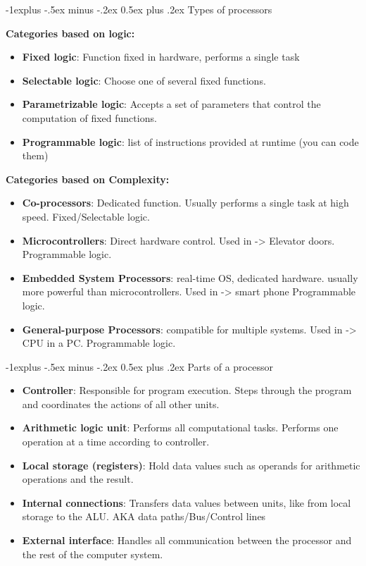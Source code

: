 \documentclass[letterpaper, 8pt]{extarticle}
\makeatletter
\renewcommand{\subsection}{\@startsection{subsection}{2}{0mm}%
                                {-1explus -.5ex minus -.2ex}%
                                {0.5ex plus .2ex}%
                                {\normalfont\small\bfseries}}
\makeatother
\begin{document}
\begin{multicols*}{4}
	\subsection{Types of processors}

	\textbf{Categories based on logic:} \\
	\begin{itemize}
		\item \textbf{Fixed logic}: Function fixed in hardware, performs a single task
		\item \textbf{Selectable logic}: Choose one of several fixed functions.
		\item \textbf{Parametrizable logic}: Accepts a set of parameters that control the computation of fixed functions.
		\item \textbf{Programmable logic}: list of instructions provided at runtime (you can code them)
	\end{itemize}

	\textbf{Categories based on Complexity:} \\
	\begin{itemize}
		\item \textbf{Co-processors}: Dedicated function. Usually performs a single task at high speed. Fixed/Selectable logic.
		\item \textbf{Microcontrollers}: Direct hardware control. Used in -> Elevator doors. Programmable logic.
		\item \textbf{Embedded System Processors}: real-time OS, dedicated hardware. usually more powerful than microcontrollers. Used in -> smart phone Programmable logic.
		\item \textbf{General-purpose Processors}: compatible for multiple systems. Used in -> CPU in a PC. Programmable logic.
	\end{itemize}

	\subsection{Parts of a processor}
	\begin{itemize}
		\item \textbf{Controller}: Responsible for program execution. Steps through the program and coordinates the actions of all other units.
		\item \textbf{Arithmetic logic unit}: Performs all computational tasks. Performs one operation at a time according to controller.
		\item \textbf{Local storage (registers)}: Hold data values such as operands for arithmetic operations and the result.
		\item \textbf{Internal connections}: Transfers data values between units, like from local storage to the ALU. AKA data paths/Bus/Control lines
		\item \textbf{External interface}: Handles all communication between the processor and the rest of the computer system.
	\end{itemize}


\end{multicols*}
\end{document}
